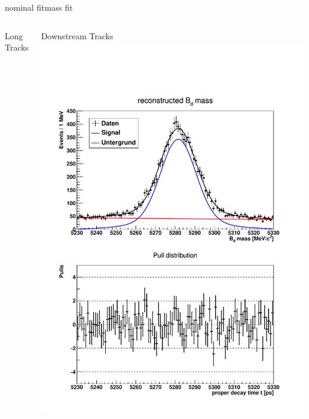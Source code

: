 \documentclass{beamer}
\begin{document}
	\begin{frame}{nominal fit}{mass fit}
	\begin{columns}
	\begin{block}{Long Tracks}
	\end{block}
	\begin{block}{Downstream Tracks}
	\includegraphics[width=\textwidth]{mass_fit_ds}
	\end{block}
	\end{columns}
	\end{frame}
	
\end{document}
